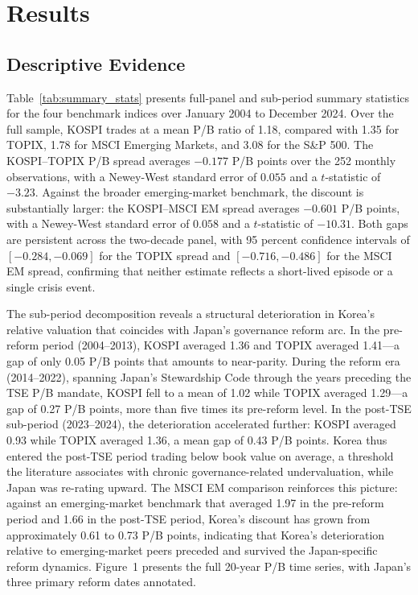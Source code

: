 \section{Results}

\subsection{Descriptive Evidence}

Table~\ref{tab:summary_stats} presents full-panel and sub-period summary statistics for the four benchmark indices over January 2004 to December 2024. Over the full sample, KOSPI trades at a mean P/B ratio of 1.18, compared with 1.35 for TOPIX, 1.78 for MSCI Emerging Markets, and 3.08 for the S\&P 500. The KOSPI--TOPIX P/B spread averages $-0.177$ P/B points over the 252 monthly observations, with a Newey-West standard error of $0.055$ and a $t$-statistic of $-3.23$. Against the broader emerging-market benchmark, the discount is substantially larger: the KOSPI--MSCI EM spread averages $-0.601$ P/B points, with a Newey-West standard error of $0.058$ and a $t$-statistic of $-10.31$. Both gaps are persistent across the two-decade panel, with 95 percent confidence intervals of $[-0.284, -0.069]$ for the TOPIX spread and $[-0.716, -0.486]$ for the MSCI EM spread, confirming that neither estimate reflects a short-lived episode or a single crisis event.

The sub-period decomposition reveals a structural deterioration in Korea's relative valuation that coincides with Japan's governance reform arc. In the pre-reform period (2004--2013), KOSPI averaged 1.36 and TOPIX averaged 1.41---a gap of only 0.05 P/B points that amounts to near-parity. During the reform era (2014--2022), spanning Japan's Stewardship Code through the years preceding the TSE P/B mandate, KOSPI fell to a mean of 1.02 while TOPIX averaged 1.29---a gap of 0.27 P/B points, more than five times its pre-reform level. In the post-TSE sub-period (2023--2024), the deterioration accelerated further: KOSPI averaged 0.93 while TOPIX averaged 1.36, a mean gap of 0.43 P/B points. Korea thus entered the post-TSE period trading below book value on average, a threshold the literature associates with chronic governance-related undervaluation, while Japan was re-rating upward. The MSCI EM comparison reinforces this picture: against an emerging-market benchmark that averaged 1.97 in the pre-reform period and 1.66 in the post-TSE period, Korea's discount has grown from approximately 0.61 to 0.73 P/B points, indicating that Korea's deterioration relative to emerging-market peers preceded and survived the Japan-specific reform dynamics. Figure~1 presents the full 20-year P/B time series, with Japan's three primary reform dates annotated.

